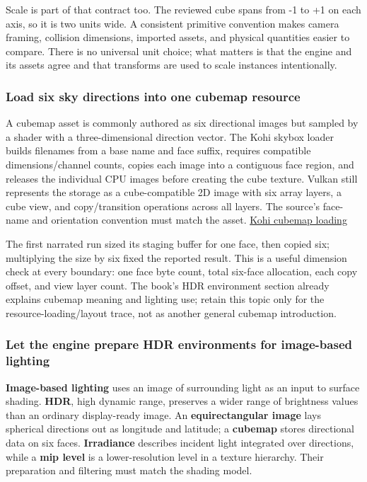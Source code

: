 Scale is part of that contract too. The reviewed cube spans from -1 to +1 on each axis, so it is two units wide. A consistent primitive convention makes camera framing, collision dimensions, imported assets, and physical quantities easier to compare. There is no universal unit choice; what matters is that the engine and its assets agree and that transforms are used to scale instances intentionally.

\subsubsection{Load six sky directions into one cubemap resource}\label{06-engine-ii-ch025-load-six-sky-directions-into-one-cubemap-resource}

A cubemap asset is commonly authored as six directional images but sampled by a shader with a three-dimensional direction vector. The Kohi skybox loader builds filenames from a base name and face suffix, requires compatible dimensions/channel counts, copies each image into a contiguous face region, and releases the individual CPU images before creating the cube texture. Vulkan still represents the storage as a cube-compatible 2D image with six array layers, a cube view, and copy/transition operations across all layers. The source's face-name and orientation convention must match the asset. \href{https://www.youtube.com/watch?v=-6yPOAwbjSI}{Kohi cubemap loading}

The first narrated run sized its staging buffer for one face, then copied six; multiplying the size by six fixed the reported result. This is a useful dimension check at every boundary: one face byte count, total six-face allocation, each copy offset, and view layer count. The book's HDR environment section already explains cubemap meaning and lighting use; retain this topic only for the resource-loading/layout trace, not as another general cubemap introduction.

\subsubsection{Let the engine prepare HDR environments for image-based lighting}\label{06-engine-ii-ch025-let-the-engine-prepare-hdr-environments-for-image-based-lighting}

\textbf{Image-based lighting} uses an image of surrounding light as an input to surface shading. \textbf{HDR}, high dynamic range, preserves a wider range of brightness values than an ordinary display-ready image. An \textbf{equirectangular image} lays spherical directions out as longitude and latitude; a \textbf{cubemap} stores directional data on six faces. \textbf{Irradiance} describes incident light integrated over directions, while a \textbf{mip level} is a lower-resolution level in a texture hierarchy. Their preparation and filtering must match the shading model.

